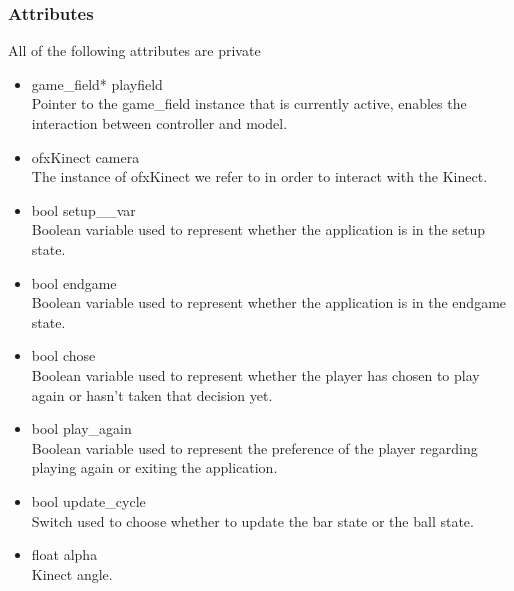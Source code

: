 \documentclass[]{article}
\begin{document}
\subsubsection{Attributes}
All of the following attributes are private
	\begin{itemize}
		\item game\_field* playfield\\Pointer to the game\_field instance that is currently active, enables the interaction between controller and model.
		\item ofxKinect camera\\The instance of ofxKinect we refer to in order to interact with the Kinect.
		\item bool setup\_\_var\\Boolean variable used to represent whether the application is in the setup state.
		\item bool endgame\\Boolean variable used to represent whether the application is in the endgame state.
		\item bool chose\\Boolean variable used to represent whether the player has chosen to play again or hasn't taken that decision yet.  
		\item bool play\_again\\Boolean variable used to represent the preference of the player regarding playing again or exiting the application.
		\item bool update\_cycle\\Switch used to choose whether to update the bar state or the ball state.
		\item float alpha\\Kinect angle.
	\end{itemize}
\end{document}
